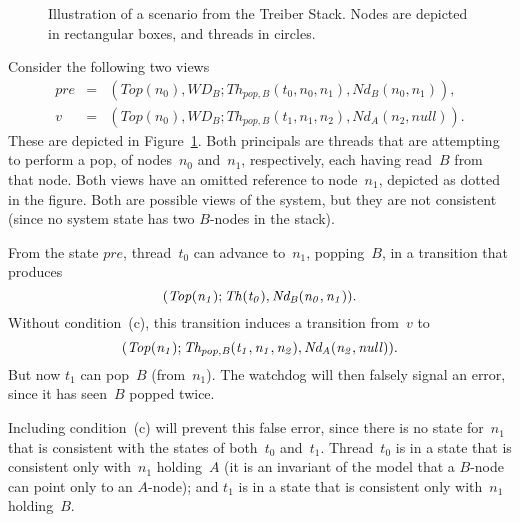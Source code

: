 
\begin{figure}\small
\def\addLabel#1#2{\draw #1++(0,0.5) node {#2};}
\begin{center}
\end{center}
\caption{Illustration of a scenario from the Treiber Stack.  Nodes are
  depicted in rectangular boxes, and threads in circles.}
\label{fig:missingCommon}
\end{figure}


Consider the following two views
%
\begin{eqnarray*}
pre & = &  (Top(n_0), WD_B; Th_{pop,B}(t_0, n_0, n_1), Nd_B(n_0, n_1)), \\
v & = & (Top(n_0), WD_B; Th_{pop,B}(t_1, n_1, n_2), Nd_A(n_2, null)).
\end{eqnarray*}
%
These are depicted in Figure~\ref{fig:missingCommon}.  Both principals are
threads that are attempting to perform a pop, of nodes~$n_0$ and~$n_1$,
respectively, each having read~$B$ from that node.  Both views have an omitted
reference to node~$n_1$, depicted as dotted in the figure.  Both are possible
views of the system, but they are not consistent (since no system state has
two $B$-nodes in the stack).

From the state $pre$, thread~$t_0$ can advance  to~$n_1$,
popping~$B$, in a transition that produces
\[\mit
(Top(n_1); Th(t_0), Nd_B(n_0, n_1)).
\]
Without condition~(c), this transition  induces a transition from~$v$ to
\[\mit
(Top(n_1); Th_{pop,B}(t_1, n_1, n_2), Nd_A(n_2, null)).
\]
But now $t_1$ can pop~$B$ (from~$n_1$).  The watchdog will then falsely signal
an error, since it has seen~$B$ popped twice. 

Including condition~(c) will prevent this false error, since there is no state
for~$n_1$ that is consistent with the states of both~$t_0$ and~$t_1$.
Thread~$t_0$ is in a state that is consistent only with~$n_1$ holding~$A$ (it
is an invariant of the model that a $B$-node can point only to an $A$-node);
and $t_1$ is in a state that is consistent only with~$n_1$ holding~$B$.


